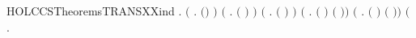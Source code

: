 \begin{SaveVerbatim}{HOLCCSTheoremsTRANSXXind}
\HOLTokenTurnstile{} \HOLSymConst{\HOLTokenForall{}}.
       \ensuremath{(}\HOLSymConst{\HOLTokenForall{}} .  \ensuremath{(}\HOLSymConst{\ensuremath{\ldotp}}\ensuremath{)}  \ensuremath{)} \HOLSymConst{\HOLTokenConj{}}
       \ensuremath{(}\HOLSymConst{\HOLTokenForall{}}   .     \HOLSymConst{\HOLTokenImp{}}  \ensuremath{(} \HOLSymConst{\ensuremath{+}} \ensuremath{)}  \ensuremath{)} \HOLSymConst{\HOLTokenConj{}}
       \ensuremath{(}\HOLSymConst{\HOLTokenForall{}}   .     \HOLSymConst{\HOLTokenImp{}}  \ensuremath{(} \HOLSymConst{\ensuremath{+}} \ensuremath{)}  \ensuremath{)} \HOLSymConst{\HOLTokenConj{}}
       \ensuremath{(}\HOLSymConst{\HOLTokenForall{}}   .     \HOLSymConst{\HOLTokenImp{}}  \ensuremath{(} \HOLSymConst{\ensuremath{\mid}} \ensuremath{)}  \ensuremath{(} \HOLSymConst{\ensuremath{\mid}} \ensuremath{)}\ensuremath{)} \HOLSymConst{\HOLTokenConj{}}
       \ensuremath{(}\HOLSymConst{\HOLTokenForall{}}   .     \HOLSymConst{\HOLTokenImp{}}  \ensuremath{(} \HOLSymConst{\ensuremath{\mid}} \ensuremath{)}  \ensuremath{(} \HOLSymConst{\ensuremath{\mid}} \ensuremath{)}\ensuremath{)} \HOLSymConst{\HOLTokenConj{}}
       \ensuremath{(}\HOLSymConst{\HOLTokenForall{}}    .

\end{SaveVerbatim}
